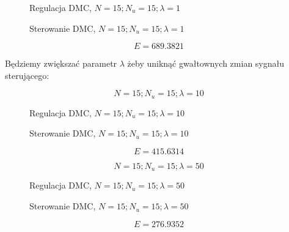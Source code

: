 \begin{figure}[H]
\centering

\caption{Regulacja DMC, $N = 15; N_u = 15; \lambda = 1$}
\end{figure}

\begin{figure}[H]
\centering

\caption{Sterowanie DMC, $N = 15; N_u = 15; \lambda = 1$}
\end{figure}

\begin{equation}
    E = \num{689,3821}
\end{equation}

Będziemy zwiększać parametr $\lambda$ żeby uniknąć gwałtownych zmian sygnału sterującego:

\begin{equation}
    N = 15; N_u = 15; \lambda = 10
\end{equation}

\begin{figure}[H]
\centering

\caption{Regulacja DMC, $N = 15; N_u = 15; \lambda = 10$}
\end{figure}

\begin{figure}[H]
\centering

\caption{Sterowanie DMC, $N = 15; N_u = 15; \lambda = 10$}
\end{figure}

\begin{equation}
    E = \num{415,6314}
\end{equation}

\begin{equation}
    N = 15; N_u = 15; \lambda = 50
\end{equation}

\begin{figure}[H]
\centering

\caption{Regulacja DMC, $N = 15; N_u = 15; \lambda = 50$}
\end{figure}

\begin{figure}[H]
\centering

\caption{Sterowanie DMC, $N = 15; N_u = 15; \lambda = 50$}
\end{figure}

\begin{equation}
    E = \num{276,9352}
\end{equation}


